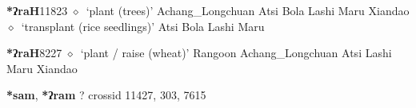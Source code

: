   \begin{list}{}{\leftmargin=1.5em \itemindent=-1.5em}
  \item {\footnotesize \textbf{*ʔraH}}{\tiny 11823}
         $\diamond$~`plant (trees)'
         Achang\_Longchuan 
\hspace{1ex}
         Atsi 
\hspace{1ex}
         Bola 
\hspace{1ex}
         Lashi 
\hspace{1ex}
         Maru 
\hspace{1ex}
         Xiandao 
\hspace{1ex}
         $\diamond$~`transplant (rice seedlings)'
         Atsi 
\hspace{1ex}
         Bola 
\hspace{1ex}
         Lashi 
\hspace{1ex}
         Maru 
  \item {\footnotesize \textbf{*ʔraH}}{\tiny 8227}
\hspace{1ex}
         $\diamond$~`plant / raise (wheat)'
         Rangoon 
\hspace{1ex}
         Achang\_Longchuan 
\hspace{1ex}
         Atsi 
\hspace{1ex}
         Lashi 
\hspace{1ex}
         Maru 
\hspace{1ex}
         Xiandao 
  \end{list}
\item
\textbf{*sam}, \textbf{*ʔram}
?
  {\tiny crossid 11427, 303, 7615}
